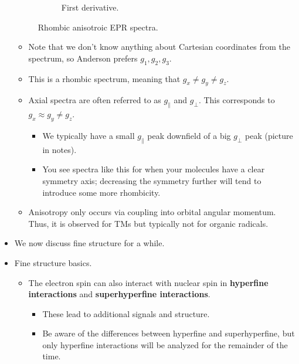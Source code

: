 \documentclass[../notes.tex]{subfiles}
\begin{document}
\begin{itemize}
\begin{figure}[H]
\begin{subfigure}[b]{0.48\linewidth}
            \caption{First derivative.}
            \label{fig:EPRanisob}
        \end{subfigure}
        \caption{Rhombic anisotroic EPR spectra.}
        \label{fig:EPRaniso}
    \end{figure}
    \begin{itemize}
        \item Note that we don't know anything about Cartesian coordinates from the spectrum, so Anderson prefers $g_1,g_2,g_3$.
        \item This is a rhombic spectrum, meaning that $g_x\neq g_y\neq g_z$.
        \item Axial spectra are often referred to as $g_\parallel$ and $g_\perp$. This corresponds to $g_x\approx g_y\neq g_z$.
        \begin{itemize}
            \item We typically have a small $g_\parallel$ peak downfield of a big $g_\perp$ peak (picture in notes).
            \item You see spectra like this for when your molecules have a clear symmetry axis; decreasing the symmetry further will tend to introduce some more rhombicity.
        \end{itemize}
        \item Anisotropy only occurs via coupling into orbital angular momentum. Thus, it is observed for TMs but typically not for organic radicals.
    \end{itemize}
    \item We now discuss fine structure for a while.
    \item Fine structure basics.
    \begin{itemize}
        \item The electron spin can also interact with nuclear spin in \textbf{hyperfine interactions} and \textbf{superhyperfine interactions}.
        \begin{itemize}
            \item These lead to additional signals and structure.
            \item Be aware of the differences between hyperfine and superhyperfine, but only hyperfine interactions will be analyzed for the remainder of the time.
        \end{itemize}

\end{itemize}
\end{itemize}
\end{document}
